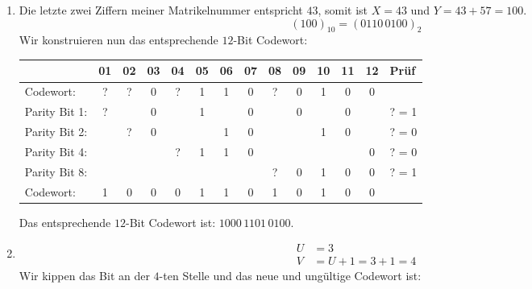 \newcommand*{\by}[0]{{\cellcolor{Orange!30}}}
\newcommand*{\py}[0]{{\cellcolor{NavyBlue!30}}}
\newcommand*{\wrng}[1]{{\cellcolor{Red!70}}\textcolor{white}{#1 X}}

\let\bnot\xoverline

\begin{enumerate}[label={[OH\arabic*]},start=15,leftmargin=0cm]
    \item 
        \begin{enumerate}[label={(\alph*)}]
            \item Die letzte zwei Ziffern meiner Matrikelnummer entspricht $43$, somit ist $X = 43$ und $Y = 43 + 57 = 100$. $$(100)_{10} = (0110 \, 0100)_2$$Wir konstruieren nun das entsprechende $12$-Bit Codewort:
                \begin{center}
                    \ttfamily\small
                    \begin{tabular}{l *{12}{c} l}
\toprule
              &  01 &  02 &  03 &  04 &  05 &  06 &  07 &  08 &  09 &  10 &  11 &  12 & Prüf\\
\midrule
Codewort:     &\py ?&\py ?&\by 0&\py ?&\by 1&\by 1&\by 0&\py ?&\by 0&\by 1&\by 0&\by 0& \\
\midrule
Parity Bit 1: &\py ?&     &\by 0&     &\by 1&     &\by 0&     &\by 0&     &\by 0&     & ? = 1\\
Parity Bit 2: &     &\py ?&\by 0&     &     &\by 1&\by 0&     &     &\by 1&\by 0&     & ? = 0\\
Parity Bit 4: &     &     &     &\py ?&\by 1&\by 1&\by 0&     &     &     &     &\by 0& ? = 0\\
Parity Bit 8: &     &     &     &     &     &     &     &\py ?&\by 0&\by 1&\by 0&\by 0& ? = 1\\
\midrule
Codewort:     &\py 1&\py 0&\by 0&\py 0&\by 1&\by 1&\by 0&\py 1&\by 0&\by 1&\by 0&\by 0& \\
\bottomrule
                    \end{tabular}
                \end{center}
                Das entsprechende $12$-Bit Codewort ist: $1000 \, 1101 \, 0100$.
            \item \blanko
                \vspace{-1.5\baselineskip}
                \begin{align*}
                    U &= 3 \\
                    V &= U + 1 = 3 + 1 = 4
                \end{align*}
                Wir kippen das Bit an der $4$-ten Stelle und das neue und ungültige Codewort ist:

\end{enumerate}
\end{enumerate}
